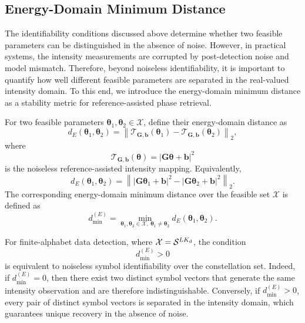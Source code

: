\documentclass[journal]{IEEEtran}
\begin{document}
\subsection{Energy-Domain Minimum Distance}

The identifiability conditions discussed above determine whether two feasible parameters can be distinguished in the absence of noise. 
However, in practical systems, the intensity measurements are corrupted by post-detection noise and model mismatch. 
Therefore, beyond noiseless identifiability, it is important to quantify how well different feasible parameters are separated in the real-valued intensity domain. 
To this end, we introduce the energy-domain minimum distance as a stability metric for reference-assisted phase retrieval.

For two feasible parameters $\boldsymbol{\theta}_1,\boldsymbol{\theta}_2\in\mathcal{X}$, define their energy-domain distance as
\begin{equation}
d_E(\boldsymbol{\theta}_1,\boldsymbol{\theta}_2)
=
\left\|
\mathcal{T}_{\mathbf{G},\mathbf{b}}(\boldsymbol{\theta}_1)
-
\mathcal{T}_{\mathbf{G},\mathbf{b}}(\boldsymbol{\theta}_2)
\right\|_2,
\label{eq:energy_domain_distance_general}
\end{equation}
where
\begin{equation}
\mathcal{T}_{\mathbf{G},\mathbf{b}}(\boldsymbol{\theta})
=
|\mathbf{G}\boldsymbol{\theta}+\mathbf{b}|^2
\end{equation}
is the noiseless reference-assisted intensity mapping. 
Equivalently,
\begin{equation}
d_E(\boldsymbol{\theta}_1,\boldsymbol{\theta}_2)
=
\left\|
|\mathbf{G}\boldsymbol{\theta}_1+\mathbf{b}|^2
-
|\mathbf{G}\boldsymbol{\theta}_2+\mathbf{b}|^2
\right\|_2.
\label{eq:energy_domain_distance_explicit}
\end{equation}
The corresponding energy-domain minimum distance over the feasible set $\mathcal{X}$ is defined as
\begin{equation}
d_{\min}^{(E)}
=
\min_{\boldsymbol{\theta}_1,\boldsymbol{\theta}_2\in\mathcal{X},\ \boldsymbol{\theta}_1\neq\boldsymbol{\theta}_2}
d_E(\boldsymbol{\theta}_1,\boldsymbol{\theta}_2).
\label{eq:energy_domain_min_distance_general}
\end{equation}

For finite-alphabet data detection, where $\mathcal{X}=\mathcal{S}^{LK_{\rm d}}$, the condition
\begin{equation}
d_{\min}^{(E)}>0
\label{eq:dmin_positive_identifiable}
\end{equation}
is equivalent to noiseless symbol identifiability over the constellation set. 
Indeed, if $d_{\min}^{(E)}=0$, then there exist two distinct symbol vectors that generate the same intensity observation and are therefore indistinguishable. 
Conversely, if $d_{\min}^{(E)}>0$, every pair of distinct symbol vectors is separated in the intensity domain, which guarantees unique recovery in the absence of noise.
\end{document}
